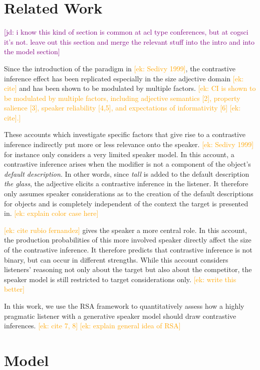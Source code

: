 \documentclass[10pt,letterpaper]{article}
\newcommand{\ek}[1]{\textcolor{Orange}{[ek: #1]}}
\newcommand{\jd}[1]{\textcolor{Purple}{[jd: #1]}}
\begin{document}
\section{Related Work}
\jd{i know this kind of section is common at acl type conferences, but at cogsci it's not. leave out this section and merge the relevant stuff into the intro and into the model section}

Since the introduction of the paradigm in \ek{Sedivy 1999}, the contrastive inference effect has been replicated especially in the size adjective domain \ek{cite} and has been shown to be modulated by multiple factors. \ek{CI is shown to be modulated by multiple factors, including adjective semantics [2], property salience [3], speaker reliability [4,5], and expectations of informativity [6] \ek{cite}.} 

These accounts which investigate specific factors that give rise to a contrastive inference indirectly put more or less relevance onto the speaker.
\ek{Sedivy 1999} for instance only considers a very limited speaker model. In this account, a contrastive inference arises when the modifier is not a component of the object's \textit{default description}. In other words, since \textit{tall} is added to the default description \textit{the glass}, the adjective elicits a contrastive inference in the listener. It therefore only assumes speaker considerations as to the creation of the default descriptions for objects and is completely independent of the context the target is presented in. \ek{explain color case here}

\ek{cite rubio fernandez} gives the speaker a more central role. In this account, the production probabilities of this more involved speaker directly affect the size of the contrastive inference. It therefore predicts that contrastive inference is not binary, but can occur in different strengths. While this account considers listeners' reasoning not only about the target but also about the competitor, the speaker model is still restricted to target considerations only. \ek{write this better}

In this work, we use the RSA framework to quantitatively assess how a highly pragmatic listener with a generative speaker model should draw contrastive inferences. \ek{cite 7, 8} \ek{explain general idea of RSA}


\section{Model}
\end{document}
